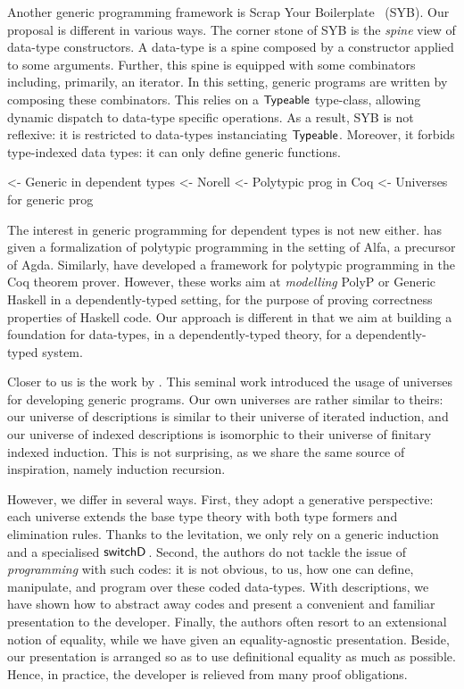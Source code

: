 Another generic programming framework is Scrap Your
Boilerplate~\cite{spj:syb} (SYB). Our proposal is different in various
ways. The corner stone of SYB is the \emph{spine} view of data-type
constructors. A data-type is a spine composed by a constructor applied
to some arguments. Further, this spine is equipped with some
combinators including, primarily, an iterator. In this setting,
generic programs are written by composing these combinators. This
relies on a $\textsf{Typeable}$ type-class, allowing dynamic dispatch to
data-type specific operations. As a result, SYB is not reflexive: it
is restricted to data-types instanciating $\textsf{Typeable}$. Moreover,
it forbids type-indexed data types: it can only define generic
functions.


\begin{wstructure}
    <- Generic in dependent types
        <- Norell \cite{norell:msc-thesis}
        <- Polytypic prog in Coq \cite{verbruggen:polytype-coq}
        <- Universes for generic prog \cite{benke:universe-generic-prog}
\end{wstructure}

The interest in generic programming for dependent types is not new
either. \citet{norell:msc-thesis} has given a formalization of
polytypic programming in the setting of Alfa, a precursor of
Agda. Similarly, \citet{verbruggen:polytype-prog-coq,
  verbruggen:polytype-coq} have developed a framework for polytypic
programming in the Coq theorem prover. However, these works aim at
\emph{modelling} PolyP or Generic Haskell in a dependently-typed
setting, for the purpose of proving correctness properties of Haskell
code. Our approach is different in that we aim at building a
foundation for data-types, in a dependently-typed theory, for a
dependently-typed system.

Closer to us is the work by \citet{benke:universe-generic-prog}. This
seminal work introduced the usage of universes for developing generic
programs. Our own universes are rather similar to theirs: our universe
of descriptions is similar to their universe of iterated induction,
and our universe of indexed descriptions is isomorphic to their
universe of finitary indexed induction. This is not surprising, as we
share the same source of inspiration, namely induction recursion.

However, we differ in several ways. First, they adopt a generative
perspective: each universe extends the base type theory with both type
formers and elimination rules. Thanks to the levitation, we only rely
on a generic induction and a specialised
$\switchD{\!}{\!}{\!}$. Second, the authors do not tackle the issue of
\emph{programming} with such codes: it is not obvious, to us, how one
can define, manipulate, and program over these coded data-types. With
descriptions, we have shown how to abstract away codes and present a
convenient and familiar presentation to the developer. Finally, the
authors often resort to an extensional notion of equality, while we
have given an equality-agnostic presentation. Beside, our presentation
is arranged so as to use definitional equality as much as
possible. Hence, in practice, the developer is relieved from many
proof obligations.
